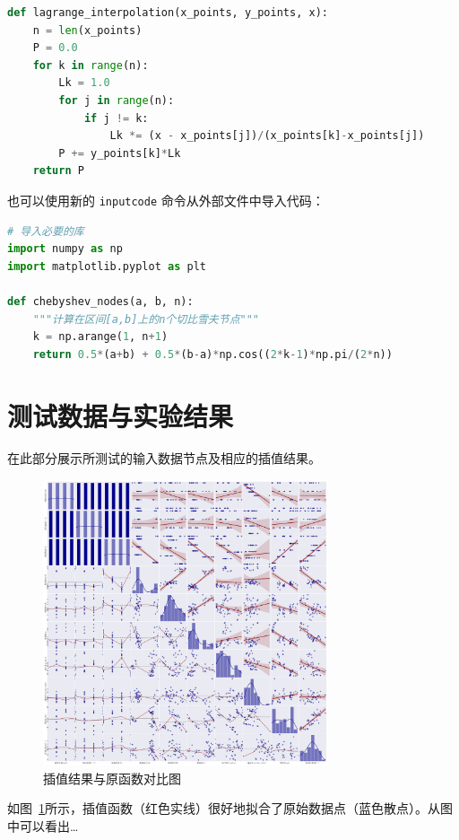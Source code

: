 \documentclass{joulabreport}
\begin{document}
\begin{lstlisting}[language=Python, caption=Lagrange插值算法实现]
def lagrange_interpolation(x_points, y_points, x):
    n = len(x_points)
    P = 0.0
    for k in range(n):
        Lk = 1.0
        for j in range(n):
            if j != k:
                Lk *= (x - x_points[j])/(x_points[k]-x_points[j])
        P += y_points[k]*Lk
    return P
\end{lstlisting}

也可以使用新的 \texttt{inputcode} 命令从外部文件中导入代码：
\begin{lstlisting}[language=Python, caption=直接在文档中编写代码]
# 导入必要的库
import numpy as np
import matplotlib.pyplot as plt

def chebyshev_nodes(a, b, n):
    """计算在区间[a,b]上的n个切比雪夫节点"""
    k = np.arange(1, n+1)
    return 0.5*(a+b) + 0.5*(b-a)*np.cos((2*k-1)*np.pi/(2*n))
\end{lstlisting}

\section{测试数据与实验结果}
在此部分展示所测试的输入数据节点及相应的插值结果。

\begin{figure}[htbp]
    \centering
    \includegraphics[width=0.75\textwidth]{figure/regression_analysis.pdf}
    \caption{插值结果与原函数对比图}
    \label{fig:regression}
\end{figure}

如图~\ref{fig:regression}所示，插值函数（红色实线）很好地拟合了原始数据点（蓝色散点）。从图中可以看出\dots
\end{document}

